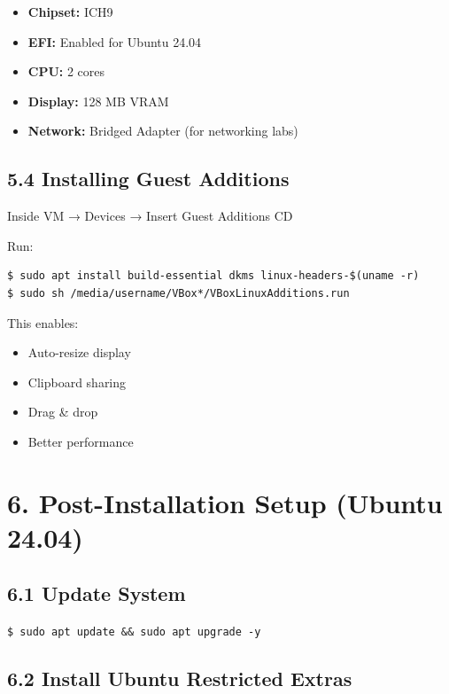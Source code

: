 \documentclass[12pt]{article}
\begin{document}
\begin{itemize}
    \item \textbf{Chipset:} ICH9
    \item \textbf{EFI:} Enabled for Ubuntu 24.04
    \item \textbf{CPU:} 2 cores
    \item \textbf{Display:} 128 MB VRAM
    \item \textbf{Network:} Bridged Adapter (for networking labs)
\end{itemize}

\subsection*{5.4 Installing Guest Additions}

Inside VM → Devices → Insert Guest Additions CD

Run:

\begin{highlightbox}
\begin{verbatim}
$ sudo apt install build-essential dkms linux-headers-$(uname -r)
$ sudo sh /media/username/VBox*/VBoxLinuxAdditions.run
\end{verbatim}
\end{highlightbox}

This enables:

\begin{itemize}
    \item Auto-resize display
    \item Clipboard sharing
    \item Drag \& drop
    \item Better performance
\end{itemize}

\section*{6. Post-Installation Setup (Ubuntu 24.04)}

\subsection*{6.1 Update System}

\begin{highlightbox}
\texttt{\$ sudo apt update \&\& sudo apt upgrade -y}
\end{highlightbox}

\subsection*{6.2 Install Ubuntu Restricted Extras}
\end{document}
